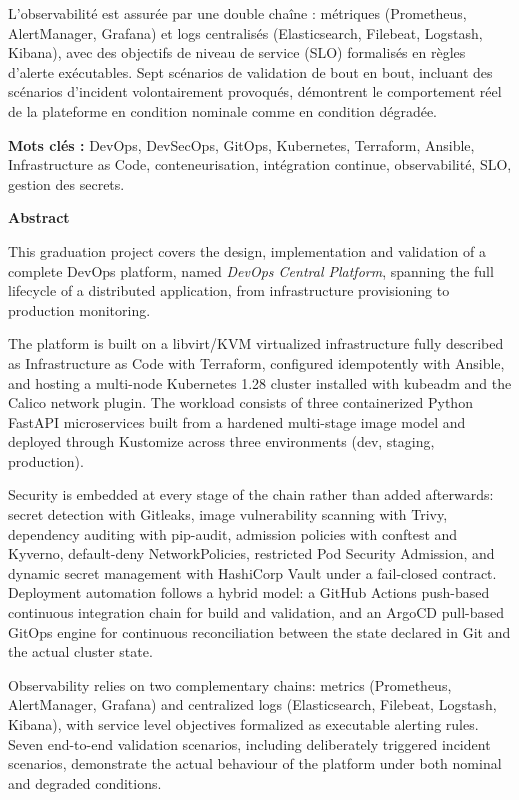 \documentclass[12pt,a4paper,twoside,openright]{report}
\begin{document}
L'observabilité est assurée par une double chaîne : métriques (Prometheus, AlertManager,
Grafana) et logs centralisés (Elasticsearch, Filebeat, Logstash, Kibana), avec des
objectifs de niveau de service (SLO) formalisés en règles d'alerte exécutables.
Sept scénarios de validation de bout en bout, incluant des scénarios d'incident
volontairement provoqués, démontrent le comportement réel de la plateforme en
condition nominale comme en condition dégradée.

\vspace{0.6cm}
\noindent\textbf{Mots clés :} DevOps, DevSecOps, GitOps, Kubernetes, Terraform, Ansible,
Infrastructure as Code, conteneurisation, intégration continue, observabilité, SLO,
gestion des secrets.

\vspace{1.4cm}
{\sffamily\Large\bfseries\color{pfeblue} Abstract\par}
\vspace{0.4cm}

This graduation project covers the design, implementation and validation of a complete
DevOps platform, named \emph{DevOps Central Platform}, spanning the full lifecycle of a
distributed application, from infrastructure provisioning to production monitoring.

The platform is built on a libvirt/KVM virtualized infrastructure fully described as
Infrastructure as Code with Terraform, configured idempotently with Ansible, and hosting
a multi-node Kubernetes 1.28 cluster installed with kubeadm and the Calico network
plugin. The workload consists of three containerized Python FastAPI microservices built
from a hardened multi-stage image model and deployed through Kustomize across three
environments (dev, staging, production).

Security is embedded at every stage of the chain rather than added afterwards: secret
detection with Gitleaks, image vulnerability scanning with Trivy, dependency auditing
with pip-audit, admission policies with conftest and Kyverno, default-deny
NetworkPolicies, restricted Pod Security Admission, and dynamic secret management with
HashiCorp Vault under a fail-closed contract. Deployment automation follows a hybrid
model: a GitHub Actions push-based continuous integration chain for build and
validation, and an ArgoCD pull-based GitOps engine for continuous reconciliation
between the state declared in Git and the actual cluster state.

Observability relies on two complementary chains: metrics (Prometheus, AlertManager,
Grafana) and centralized logs (Elasticsearch, Filebeat, Logstash, Kibana), with service
level objectives formalized as executable alerting rules. Seven end-to-end validation
scenarios, including deliberately triggered incident scenarios, demonstrate the actual
behaviour of the platform under both nominal and degraded conditions.
\end{document}
